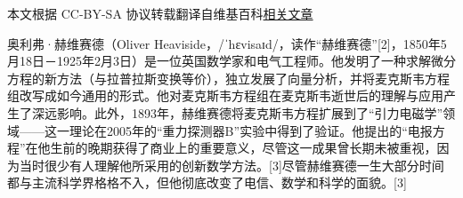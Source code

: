 
本文根据 CC-BY-SA 协议转载翻译自维基百科\href{https://en.wikipedia.org/wiki/Oliver_Heaviside}{相关文章}

奥利弗·赫维赛德（Oliver Heaviside，/ˈhɛvisaɪd/，读作“赫维赛德”[2]，1850年5月18日－1925年2月3日）是一位英国数学家和电气工程师。他发明了一种求解微分方程的新方法（与拉普拉斯变换等价），独立发展了向量分析，并将麦克斯韦方程组改写成如今通用的形式。他对麦克斯韦方程组在麦克斯韦逝世后的理解与应用产生了深远影响。此外，1893年，赫维赛德将麦克斯韦方程扩展到了“引力电磁学”领域——这一理论在2005年的“重力探测器B”实验中得到了验证。他提出的“电报方程”在他生前的晚期获得了商业上的重要意义，尽管这一成果曾长期未被重视，因为当时很少有人理解他所采用的创新数学方法。[3]尽管赫维赛德一生大部分时间都与主流科学界格格不入，但他彻底改变了电信、数学和科学的面貌。[3]
